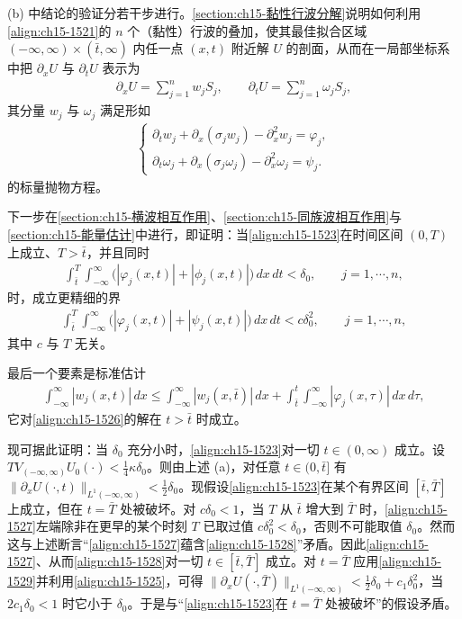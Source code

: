 \documentclass[../../main.tex]{subfiles}
\begin{document}
(b) 中结论的验证分若干步进行。\cref{section:ch15-黏性行波分解}说明如何利用\eqref{align:ch15-1521}的 $n$ 个（黏性）行波的叠加，使其最佳拟合区域 $(-\infty,\infty)\times(\bar t,\infty)$ 内任一点 $(x,t)$ 附近解 $U$ 的剖面，从而在一局部坐标系中把 $\partial_xU$ 与 $\partial_tU$ 表示为
\begin{align}
\partial_xU=\sum_{j=1}^nw_jS_j,\qquad\partial_tU=\sum_{j=1}^n\omega_jS_j,
\label{align:ch15-1525}
\end{align}
其分量 $w_j$ 与 $\omega_j$ 满足形如
\begin{align}
\begin{cases}
\partial_tw_j+\partial_x(\sigma_jw_j)-\partial_x^2w_j=\varphi_j,\\
\partial_t\omega_j+\partial_x(\sigma_j\omega_j)-\partial_x^2\omega_j=\psi_j.
\end{cases}
\label{align:ch15-1526}
\end{align}
的标量抛物方程。

下一步在\cref{section:ch15-横波相互作用}、\cref{section:ch15-同族波相互作用}与\cref{section:ch15-能量估计}中进行，即证明：当\eqref{align:ch15-1523}在时间区间 $(0,T)$ 上成立、$T>\bar t$，并且同时
\begin{align}
\int_{\bar t}^{T}\int_{-\infty}^{\infty}\bigl(|\varphi_j(x,t)|+|\phi_j(x,t)|\bigr)\,dx\,dt<\delta_0,\qquad j=1,\cdots,n,
\label{align:ch15-1527}
\end{align}
时，成立更精细的界
\begin{align}
\int_{\bar t}^{T}\int_{-\infty}^{\infty}\bigl(|\varphi_j(x,t)|+|\psi_j(x,t)|\bigr)\,dx\,dt<c\delta_0^2,\qquad j=1,\cdots,n,
\label{align:ch15-1528}
\end{align}
其中 $c$ 与 $T$ 无关。

最后一个要素是标准估计
\begin{align}
\int_{-\infty}^{\infty}|w_j(x,t)|\,dx\leqslant\int_{-\infty}^{\infty}|w_j(x,\bar t)|\,dx+\int_{\bar t}^{t}\int_{-\infty}^{\infty}|\varphi_j(x,\tau)|\,dx\,d\tau,
\label{align:ch15-1529}
\end{align}
它对\eqref{align:ch15-1526}的解在 $t>\bar t$ 时成立。

现可据此证明：当 $\delta_0$ 充分小时，\eqref{align:ch15-1523}对一切 $t\in(0,\infty)$ 成立。设 $TV_{(-\infty,\infty)}U_0(\cdot)<\frac14\kappa\delta_0$。则由上述 (a)，对任意 $t\in(0,\bar t]$ 有 $\|\partial_xU(\cdot,t)\|_{L^1(-\infty,\infty)}<\frac12\delta_0$。现假设\eqref{align:ch15-1523}在某个有界区间 $[\bar t,\bar T]$ 上成立，但在 $t=\bar T$ 处被破坏。对 $c\delta_0<1$，当 $T$ 从 $\bar t$ 增大到 $\bar T$ 时，\eqref{align:ch15-1527}左端除非在更早的某个时刻 $T$ 已取过值 $c\delta_0^2<\delta_0$，否则不可能取值 $\delta_0$。然而这与上述断言“\eqref{align:ch15-1527}蕴含\eqref{align:ch15-1528}”矛盾。因此\eqref{align:ch15-1527}、从而\eqref{align:ch15-1528}对一切 $t\in[\bar t,\bar T]$ 成立。对 $t=\bar T$ 应用\eqref{align:ch15-1529}并利用\eqref{align:ch15-1525}，可得 $\|\partial_xU(\cdot,\bar T)\|_{L^1(-\infty,\infty)}<\frac12\delta_0+c_1\delta_0^2$，当 $2c_1\delta_0<1$ 时它小于 $\delta_0$。于是与“\eqref{align:ch15-1523}在 $t=\bar T$ 处被破坏”的假设矛盾。
\end{document}
